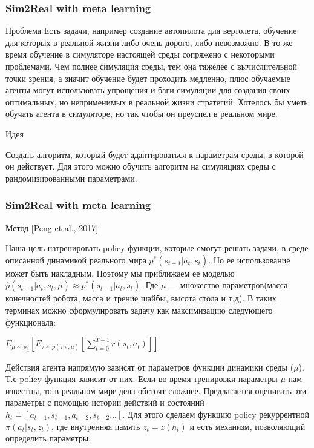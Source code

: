 \documentclass[fleqn, xcolor=x11names]{beamer}
\begin{document}
\begin{frame}\frametitle{Sim2Real with meta learning}

\begin{block}{{\footnotesize Проблема}}
{\footnotesize Есть задачи, например создание автопилота для вертолета, обучение для которых в реальной жизни либо очень дорого, либо невозможно. В то же время обучение в симуляторе настоящей среды сопряжено с некоторыми проблемами. Чем полнее симуляция среды, тем она тяжелее с вычислительной точки зрения, а значит обучение будет проходить медленно, плюс обучаемые агенты могут использовать упрощения и баги симуляции для создания своих оптимальных, но неприменимых в реальной жизни стратегий. Хотелось бы уметь обучать агента в симуляторе, но так чтобы он преуспел в реальном мире.}
\end{block}

\begin{block}{{\footnotesize Идея}}

{\footnotesize Создать алгоритм, который будет адаптироваться к параметрам среды, в которой он действует. Для этого можно обучить алгоритм на симуляциях среды с рандомизированными параметрами.}

\end{block}

\end{frame}

\begin{frame}\frametitle{Sim2Real with meta learning}

\begin{block}{{\footnotesize Метод [Peng et al., 2017]}}
{\footnotesize
Наша цель натренировать policy функции, которые смогут решать задачи, в среде описанной динамикой реального мира $p^*(s_{t+1}|a_t, s_t)$. Но ее использование может быть накладным. Поэтому мы приближаем ее моделью $\hat{p}(s_{t+1}|a_t, s_t, \mu) \approx p^*(s_{t+1}|a_t, s_t)$. Где $\mu$ --- множество параметров(масса конечностей робота, масса и трение шайбы, высота стола и т.д). В таких терминах можно сформулировать задачу как максимизацию следующего функционала:
\begin{center}
$ E_{\mu \sim \rho_{\mu}} \left[ E_{\tau \sim p(\tau|\pi,\mu)} \left[  \sum \limits_{t=0}^{T-1} r(s_t, a_t) \right] \right]$
\end{center}
Действия агента напрямую зависят от параметров функции динамики среды ($\mu$). Т.е policy функция зависит от них. Если во время тренировки параметры $\mu$ нам известны, то в реальном мире дела обстоят сложнее. Предлагается оценивать эти параметры с помощью истории действий и состояний $h_t = [a_{t-1}, s_{t-1}, a_{t-2}, s_{t-2}...]$. Для этого сделаем функцию policy рекуррентной $\pi(a_t|s_t, z_t)$, где внутренняя память $z_t = z(h_t)$ и есть механизм, позволяющий определить параметры.
}
\end{block}

\end{frame}
\end{document}
